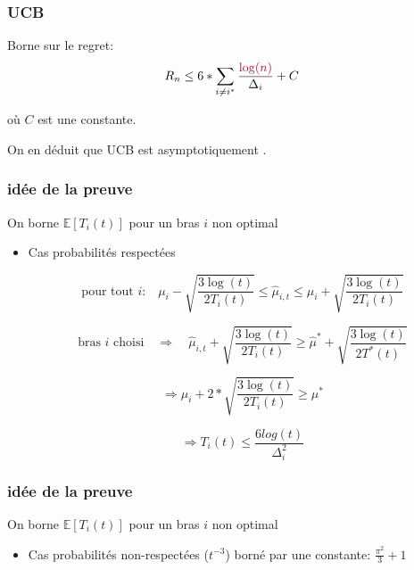 \documentclass[compress, color = usenames, dvipsnames]{beamer}
\begin{document}
\begin{frame}
    \frametitle{UCB}
    Borne sur le regret:
    $$ R_n \le 6*\sum_{i \ne i^*}\frac{\red{\log(n)}}{\Delta_i} + C $$
    
    où $C$ est une constante.

    On en déduit que UCB est asymptotiquement .
\end{frame}

\begin{frame}
    \frametitle{idée de la preuve}
    On borne $\mathbb{E}[T_i(t)]$ pour un bras $i$ non optimal

    \begin{itemize}
        \item Cas probabilités respectées

            $$ \text{pour tout $i$:} \quad \mu_{i}-\sqrt{\frac{3\log(t)}{2T_i(t)}} \le \hat{\mu}_{i,t} \le  \mu_{i}+\sqrt{\frac{3\log(t)}{2T_i(t)}}$$

            $$ \text{bras $i$ choisi}  \quad \Rightarrow \quad \hat{\mu}_{i,t}+\sqrt{\frac{3\log(t)}{2T_i(t)}} \ge \hat{\mu}^{*} +\sqrt{\frac{3\log(t)}{2T^*(t)}}$$

            $$ \Rightarrow \mu_{i}+2*\sqrt{\frac{3\log(t)}{2T_i(t)}} \ge \mu^{*} $$

            $$ \Rightarrow T_i(t) \le \frac{6log(t)}{\Delta_i^2} $$

    \end{itemize}

   
\end{frame}

\begin{frame}
    \frametitle{idée de la preuve}
    On borne $\mathbb{E}[T_i(t)]$ pour un bras $i$ non optimal

    \begin{itemize}

        \item Cas probabilités non-respectées ($t^{-3}$)
        \itemSo borné par une constante: $\frac{\pi^2}{3}+1$
    \end{itemize}

   
\end{frame}
\end{document}
